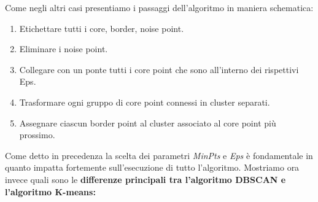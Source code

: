 Come negli altri casi presentiamo i passaggi dell'algoritmo in maniera schematica:
\begin{enumerate}
	\item Etichettare tutti i core, border, noise point.
	\item Eliminare i noise point.
	\item Collegare con un ponte tutti i core point che sono all'interno dei rispettivi Eps.
	\item Trasformare ogni gruppo di core point connessi in cluster separati.
	\item Assegnare  ciascun border point al cluster associato al core point più prossimo.
\end{enumerate}

Come detto in precedenza la scelta dei parametri \textit{MinPts} e \textit{Eps} è fondamentale in quanto impatta fortemente sull'esecuzione di tutto l'algoritmo. Mostriamo ora invece quali sono le \textbf{differenze principali tra l'algoritmo DBSCAN e l'algoritmo K-means:}
